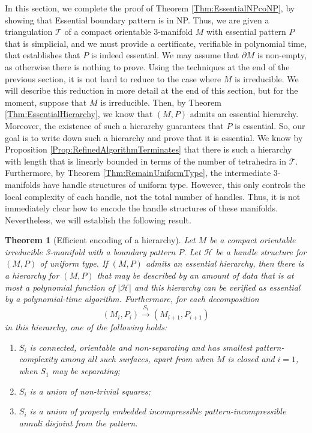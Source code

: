\documentclass[oneside]{amsart}
\numberwithin{equation}{section}
\theoremstyle{plain}
\newtheorem{theorem}[equation]{Theorem}
\theoremstyle{definition}
\newcommand{\calT}{{\mathcal{T}}}
\begin{document}
In this section, we complete the proof of Theorem \ref{Thm:EssentialNPcoNP}, by showing that 
{\sc Essential boundary pattern} is in NP. Thus, we are given a triangulation $\calT$ of a compact orientable 3-manifold
$M$ with essential pattern $P$ that is simplicial, and we must provide a certificate, verifiable in polynomial time, that
establishes that $P$ is indeed essential. We may assume that $\partial M$ is non-empty, as otherwise there is nothing to prove.
Using the techniques at the end of the previous section,
it is not hard to reduce to the case where $M$ is irreducible. We will describe this reduction in more detail 
at the end of this section, but for the moment, suppose that $M$ is irreducible. Then, by Theorem \ref{Thm:EssentialHierarchy}, 
we know that $(M,P)$ admits an essential hierarchy. Moreover, the existence of such a hierarchy
guarantees that $P$ is essential. So, our goal is to write down such a hierarchy and prove that it is essential. We know by 
Proposition \ref{Prop:RefinedAlgorithmTerminates} that there is such a hierarchy with length that is
linearly bounded in terms of the number of tetrahedra in $\calT$. Furthermore, by Theorem \ref{Thm:RemainUniformType},
the intermediate 3-manifolds have handle structures of uniform type. However, this only controls the local
complexity of each handle, not the total number of handles. Thus, it is not immediately clear how to 
encode the handle structures of these manifolds. Nevertheless, we will establish the following result.

\begin{theorem}[Efficient encoding of a hierarchy]
\label{Thm:VerifyEssHierarchy}
Let $M$ be a compact orientable irreducible 3-manifold with a boundary pattern $P$.
Let $\mathcal{H}$ be a handle structure for $(M,P)$ of uniform type. If $(M,P)$
admits an essential hierarchy, then there is a hierarchy for $(M,P)$ that may be
described by an amount of data that is at most a polynomial function of $|\mathcal{H}|$
and this hierarchy can be verified as essential by a polynomial-time algorithm.
Furthermore, for each decomposition 
$$(M_i,P_i) \xrightarrow{S_i} (M_{i+1}, P_{i+1})$$
in this hierarchy, one of the following holds:
\begin{enumerate}
\item $S_i$ is connected, orientable and non-separating and has smallest pattern-complexity
among all such surfaces, apart from when $M$ is closed and $i=1$, when $S_1$ may be separating;
\item $S_i$ is a union of non-trivial squares;
\item $S_i$ is a union of properly embedded incompressible pattern-incompressible annuli disjoint from the pattern.
\end{enumerate}
\end{theorem}
\end{document}
